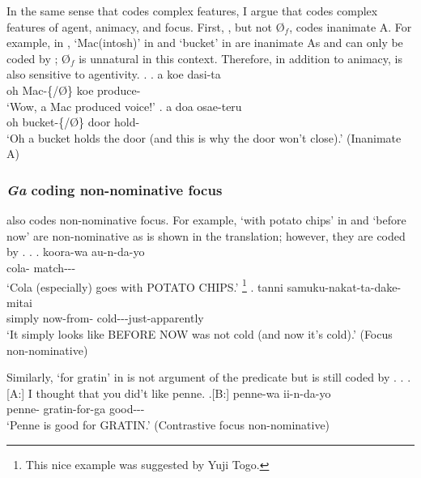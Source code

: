 In the same sense that  codes complex features,
I argue that  codes complex features
of agent, animacy, and focus.
First,
, but not {\O$_{f}$}, codes inanimate A.
For example, in \Next,
 `Mac(intosh)' in \Next[a] and  `bucket' in \Next[b]
are inanimate As
and can only be coded by ;
{\O$_{f}$} is unnatural in this context.
Therefore, in addition to animacy,
 is also sensitive to agentivity.
%
\ex. \label{ExInanimateA}
 \ag. a  koe dasi-ta \\
  oh Mac-\{/{\O}\} koe produce- \\
  `Wow, a Mac produced voice!'
 \bg. a  doa osae-teru \\
  oh bucket-\{/{\O}\} door hold- \\
  `Oh a bucket holds the door (and this is why the door won't close).'
   \hfill{(Inanimate A)}

\subsubsection{\textit{Ga} coding non-nominative focus}\label{Par:CasePar:Ga:GaFoc}

 also codes non-nominative focus.
For example, 
 `with potato chips' in \Next[a] and
 `before now'
are non-nominative
as is shown in the translation;
however, they are coded by .
%
\ex.\label{ExNon-ArgFocus}
 \ag. koora-wa  au-n-da-yo \\
   cola-  match--- \\
   `Cola (especially) goes with POTATO CHIPS.'%
    \footnote{
    This nice example was suggested by Yuji Togo.
    }
 \bg. tanni  samuku-nakat-ta-dake-mitai \\
   simply now-from- cold---just-apparently \\
   `It simply looks like BEFORE NOW was not cold (and now it's cold).'
 \hfill{(Focus non-nominative)}

Similarly,
 `for gratin' in \Next[B] is not argument of the predicate
but is still coded by .
%
\ex. \a.[A:] I thought that you did't like penne.
	\bg.[B:] penne-wa  ii-n-da-yo \\
	penne- gratin-for-{ga} good--- \\
	`Penne is good for GRATIN.' \hfill{(Contrastive focus non-nominative)}

